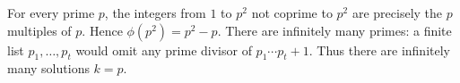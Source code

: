 For every prime $p$, the integers from $1$ to $p^2$ not coprime to $p^2$ are precisely the $p$ multiples of $p$. Hence $\phi(p^2)=p^2-p$. There are infinitely many primes: a finite list $p_1,\ldots,p_t$ would omit any prime divisor of $p_1\cdots p_t+1$. Thus there are infinitely many solutions $k=p$.
